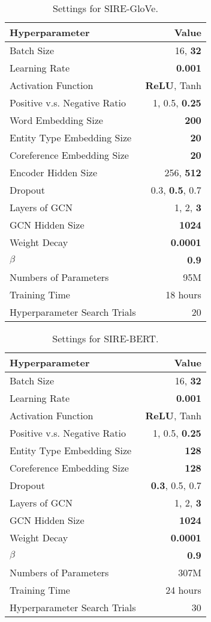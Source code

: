 \documentclass[11pt,a4paper]{article}
\begin{document}
\begin{table}[!htbp]
\centering
\begin{tabular}{lr}
\hline
\textbf{Hyperparameter} & Value \\
\hline
Batch Size &  16, \textbf{32} \\
Learning Rate  & \textbf{0.001}  \\
Activation Function & \textbf{ReLU}, Tanh \\
Positive v.s. Negative Ratio & 1, 0.5, \textbf{0.25} \\
Word Embedding Size  & \textbf{200}\\
Entity Type Embedding Size & \textbf{20}  \\
Coreference Embedding Size & \textbf{20}  \\
Encoder Hidden Size &  256, \textbf{512} \\
Dropout &  0.3, \textbf{0.5}, 0.7 \\
Layers of GCN & 1, 2, \textbf{3} \\
GCN Hidden Size & \textbf{1024} \\
Weight Decay & \textbf{0.0001} \\
$\beta$ & \textbf{0.9} \\
\hline \hline
Numbers of Parameters & 95M \\ Training Time & 18 hours \\
Hyperparameter Search Trials & 20 \\
\hline
\end{tabular}
\caption{Settings for SIRE-GloVe.}
\label{tab:hyperparam1}
\end{table}


\begin{table}[!htbp]
\centering
\begin{tabular}{lr}
\hline
\textbf{Hyperparameter} & Value \\
\hline
Batch Size & 16, \textbf{32} \\
Learning Rate  & \textbf{0.001}  \\
Activation Function & \textbf{ReLU}, Tanh \\
Positive v.s. Negative Ratio & 1, 0.5, \textbf{0.25} \\
Entity Type Embedding Size & \textbf{128} \\
Coreference Embedding Size & \textbf{128} \\
Dropout & \textbf{0.3}, 0.5, 0.7 \\
Layers of GCN & 1, 2, \textbf{3} \\
GCN Hidden Size & \textbf{1024} \\
Weight Decay & \textbf{0.0001} \\
$\beta$ & \textbf{0.9} \\
\hline \hline
Numbers of Parameters & 307M \\ Training Time & 24 hours \\
Hyperparameter Search Trials & 30 \\
\hline
\end{tabular}
\caption{Settings for SIRE-BERT.}
\label{tab:hyperparam2}
\end{table}

 
\end{document}
